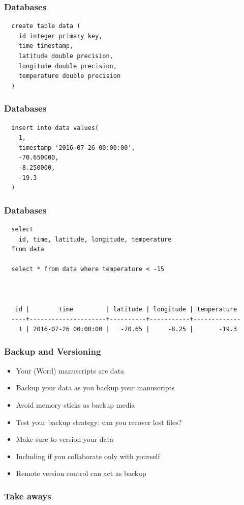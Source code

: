 \documentclass{beamer}
\begin{document}
\begin{frame}[fragile]
  \frametitle{Databases}
  
  \small
  \begin{verbatim}
  create table data (
    id integer primary key, 
    time timestamp, 
    latitude double precision, 
    longitude double precision, 
    temperature double precision
  )
  \end{verbatim}
\end{frame}

\begin{frame}[fragile]
  \frametitle{Databases}
  
  \small
  \begin{verbatim}
  insert into data values(
    1, 
    timestamp '2016-07-26 00:00:00', 
    -70.650000, 
    -8.250000, 
    -19.3
  )
  \end{verbatim}
\end{frame}

\begin{frame}[fragile]
  \frametitle{Databases}
  
  \small
  \begin{verbatim}
  select 
    id, time, latitude, longitude, temperature
  from data
  
  select * from data where temperature < -15
  
  
  
   id |        time         | latitude | longitude | temperature 
  ----+---------------------+----------+-----------+-------------
    1 | 2016-07-26 00:00:00 |   -70.65 |     -8.25 |       -19.3 
  \end{verbatim}
\end{frame}

\begin{frame}
  \frametitle{Backup and Versioning}
  
  \begin{itemize}
  \item Your (Word) manuscripts are data
  \item Backup your data as you backup your manuscripts
  \item Avoid memory sticks as backup media
  \item Test your backup strategy: can you recover lost files?
  \item Make sure to version your data
  \item Including if you collaborate only with yourself
  \item Remote version control can act as backup
  \end{itemize}
\end{frame}

\begin{frame}
  \frametitle{Take aways}
  
\end{frame}
\end{document}
